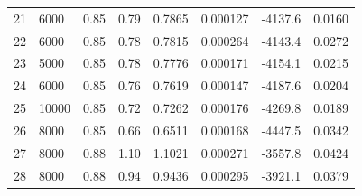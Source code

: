 \documentclass{article}
\begin{document}
\begin{center}
\begin{tabular}{llllllll}
21 & 6000 & 0.85 & 0.79 & 0.7865 & 0.000127 & -4137.6 & 0.0160\\
22 & 6000 & 0.85 & 0.78 & 0.7815 & 0.000264 & -4143.4 & 0.0272\\
23 & 5000 & 0.85 & 0.78 & 0.7776 & 0.000171 & -4154.1 & 0.0215\\
24 & 6000 & 0.85 & 0.76 & 0.7619 & 0.000147 & -4187.6 & 0.0204\\
25 & 10000 & 0.85 & 0.72 & 0.7262 & 0.000176 & -4269.8 & 0.0189\\
26 & 8000 & 0.85 & 0.66 & 0.6511 & 0.000168 & -4447.5 & 0.0342\\
27 & 8000 & 0.88 & 1.10 & 1.1021 & 0.000271 & -3557.8 & 0.0424\\
28 & 8000 & 0.88 & 0.94 & 0.9436 & 0.000295 & -3921.1 & 0.0379
\end{tabular}
\end{center}
\end{document}
